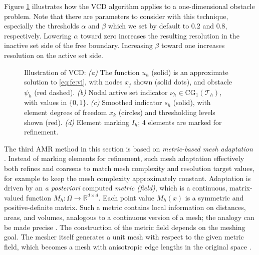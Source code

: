 \documentclass[]{interact}
\theoremstyle{plain}%
\theoremstyle{definition}
\theoremstyle{remark}
\newcommand{\RR}{\mathbb{R}}
\newcommand{\cT}{\mathcal{T}}
\newcommand{\CG}{\text{CG}}
\begin{document}
Figure \ref{fig:vcdillustration} illustrates how the VCD algorithm applies to a one-dimensional obstacle problem.  Note that there are parameters to consider with this technique, especially the thresholds $\alpha$ and $\beta$ which we set by default to $0.2$ and $0.8$, respectively.  Lowering $\alpha$ toward zero increases the resulting resolution in the inactive set side of the free boundary.  Increasing $\beta$ toward one increases resolution on the active set side.

\begin{figure}[ht]

\caption{Illustration of VCD: \emph{(a)} The function $u_h$ (solid) is an approximate solution to \eqref{eq:fe:vi}, with nodes $x_j$ shown (solid dots), and obstacle $\psi_h$ (red dashed).  \emph{(b)} Nodal active set indicator $\nu_h \in \CG_1(\cT_h)$, with values in $\{0,1\}$.  \emph{(c)} Smoothed indicator $s_h$ (solid), with element degrees of freedom $x_k$ (circles) and thresholding levels shown (red).  \emph{(d)} Element marking $I_h$; 4 elements are marked for refinement.}
\label{fig:vcdillustration}
\end{figure}

The third AMR method in this section is based on \emph{metric-based mesh adaptation} \cite{Alauzet2010}.  Instead of marking elements for refinement, such mesh adaptation effectively both refines and coarsens to match mesh complexity and resolution target values, for example to keep the mesh complexity approximately constant.  Adaptation is driven by an \emph{a posteriori} computed \emph{metric (ﬁeld)}, which is a continuous, matrix-valued function $M_h:\Omega \to \RR^{d\times d}$.  Each point value $M_h(x)$ is a symmetric and positive-definite matrix.  Such a metric contains local information on distances, areas, and volumes, analogous to a continuous version of a mesh; the analogy can be made precise \cite{LoseilleAlauzet2011}.  The construction of the metric field depends on the meshing goal.  The mesher itself generates a unit mesh with respect to the given metric field, which becomes a mesh with anisotropic edge lengths in the original space \cite{Wallworketal2020}.
\end{document}
